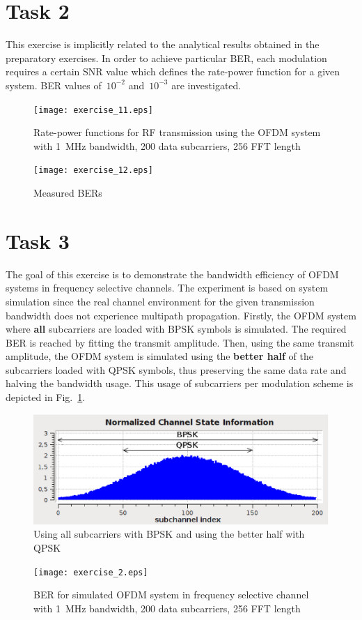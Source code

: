 \documentclass[a4paper,10pt]{paper}
\begin{document}


\section{Task 2}
This exercise is implicitly related to the analytical results obtained in the preparatory exercises. In order to achieve particular BER, each modulation requires a certain SNR value which defines the rate-power function for a given system. BER values of~$10^{-2}$ and~$10^{-3}$ are investigated.
\begin{figure}[h]
\centering
\texttt{[image: exercise\_11.eps]}
\caption{Rate-power functions for RF transmission using the OFDM system with 1~MHz bandwidth, 200 data subcarriers, 256 FFT length}
\end{figure}
\begin{figure}[h]
\centering
\texttt{[image: exercise\_12.eps]}
\caption{Measured BERs}
\end{figure}

\newpage
\section{Task 3}
The goal of this exercise is to demonstrate the bandwidth efficiency of OFDM systems in frequency selective channels. The experiment is based on system simulation since the real channel environment for the given transmission bandwidth does not experience multipath propagation. Firstly, the OFDM system where \textbf{all} subcarriers are loaded with BPSK symbols is simulated. The required BER is reached by fitting the transmit amplitude. Then, using the same transmit amplitude, the OFDM system is simulated using the \textbf{better half} of the subcarriers loaded with QPSK symbols, thus preserving the same data rate and halving the bandwidth usage. This usage of subcarriers per modulation scheme is depicted in Fig.~\ref{fig:FSC}.
\begin{figure}[thb]
\centering
\includegraphics[width=.95\linewidth]{csi.eps}
\caption{Using all subcarriers with BPSK and using the better half with QPSK}\label{fig:FSC}
\end{figure}
\begin{figure}[thb]
\centering
\texttt{[image: exercise\_2.eps]}
\caption{BER for simulated OFDM system in frequency selective channel with 1~MHz bandwidth, 200 data subcarriers, 256 FFT length}
\end{figure}
\end{document}

